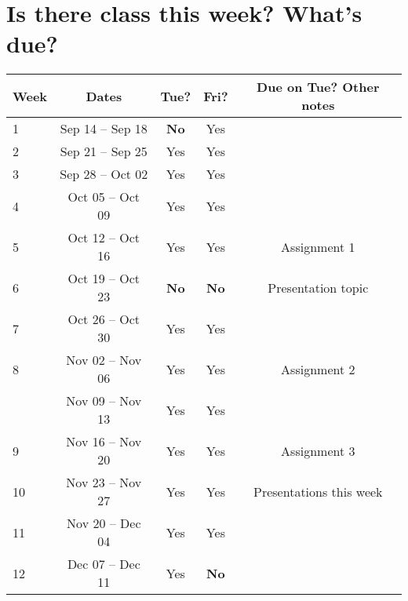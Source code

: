 \documentclass{article}
\begin{document}
\section*{Is there class this week? What's due?}

\begin{table}[H]
\begin{center}
\begin{tabular}{lcccc}
Week & Dates &  \quad Tue? \quad & \quad Fri? \quad & \quad Due on Tue? Other notes\\
\hline
\hline
1 & Sep 14 -- Sep 18 & {\bf No} & Yes & \\ %
2 & Sep 21 -- Sep 25 & Yes & Yes & \\ %
3 & Sep 28 -- Oct 02 & Yes & Yes & \\ %
4 & Oct 05 -- Oct 09 & Yes & Yes & \\ %
5 & Oct 12 -- Oct 16 & Yes & Yes & Assignment 1 \\ %
6 & Oct 19 -- Oct 23 & {\bf No} & {\bf No} & Presentation topic \\ %
7 & Oct 26 -- Oct 30 & Yes & Yes & \\ %
8 & Nov 02 -- Nov 06 & Yes & Yes & Assignment 2\\ %
 & Nov 09 -- Nov 13 & Yes & Yes & \\ 
9 & Nov 16 -- Nov 20 &  Yes & Yes &  Assignment 3 \\ %
10 & Nov 23 -- Nov 27 & Yes & Yes & Presentations this week\\ 
11 & Nov 20 -- Dec 04 & Yes & Yes \\ %
12 & Dec 07 -- Dec 11 & Yes & {\bf No} %
\end{tabular}
\end{center}
\end{table}
\end{document}
